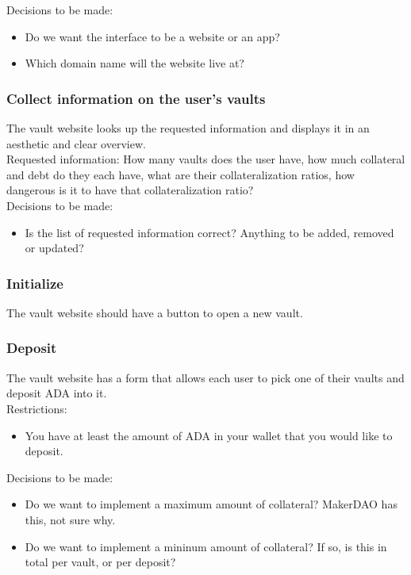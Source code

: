 \documentclass{article} %
\begin{document}
Decisions to be made:
\begin{itemize}
  \item Do we want the interface to be a website or an app?
  \item Which domain name will the website live at?
\end{itemize}

\subsubsection{Collect information on the user's vaults}

The vault website looks up the requested information and displays it in an
aesthetic and clear overview. \\

Requested information: How many vaults does the user have, how much collateral
and debt do they each have, what are their collateralization ratios, how
dangerous is it to have that collateralization ratio? \\

Decisions to be made:
\begin{itemize}
  \item Is the list of requested information correct? Anything to be added,
    removed or updated?
\end{itemize}

\subsubsection{Initialize}

The vault website should have a button to open a new vault.

\subsubsection{Deposit}

The vault website has a form that allows each user to pick one of their vaults
and deposit ADA into it. \\

Restrictions:
\begin{itemize}
  \item You have at least the amount of ADA in your wallet that you would like
    to deposit.
\end{itemize}

Decisions to be made:
\begin{itemize}
  \item Do we want to implement a maximum amount of collateral? MakerDAO has
    this, not sure why.
  \item Do we want to implement a mininum amount of collateral? If so, is this
    in total per vault, or per deposit?
\end{itemize}
\end{document}
